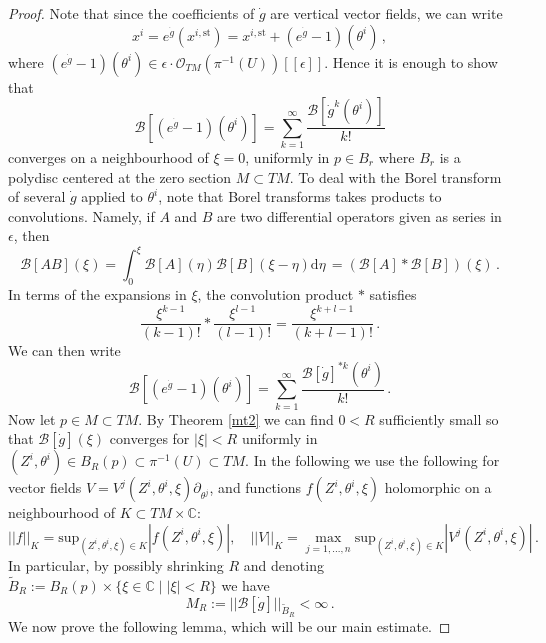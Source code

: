 \documentclass{article}
\theoremstyle{definition}
\numberwithin{equation}{section}
\begin{document}
\begin{proof}
    Note that since the coefficients of $\dot{g}$ are vertical vector fields, we can write
    \begin{equation*}
        x^i = e^{\dot{g}}(x^{i,\text{st}})=x^{i,\text{st}}+(e^{\dot{g}}-1)(\theta^i)\,,
    \end{equation*}
    where $(e^{\dot{g}}-1)(\theta^i)\in \epsilon \cdot  \mathcal{O}_{TM}(\pi^{-1}(U))[[\epsilon]]$.
    Hence it is enough to show that \begin{equation*}
        \mathcal{B}[(e^{\dot{g}}-1)(\theta^i)] = \sum_{k=1}^{\infty}\frac{\mathcal{B}[\dot{g}^k(\theta^i)]}{k!}
    \end{equation*}
    converges on a neighbourhood of $\xi=0$, uniformly in $p\in B_r$ where $B_r$ is a polydisc centered at the zero section $M\subset TM$. To deal with the Borel transform of several $\dot{g}$ applied to $\theta^i$, note that Borel transforms takes products to convolutions. Namely, if $A$ and $B$ are two differential operators given as series in $\epsilon$, then 
    \begin{equation}\label{convform}
        \mathcal{B}[AB](\xi)=\int_{0}^{\xi}\mathcal{B}[A](\eta)\mathcal{B}[B](\xi-\eta)\mathrm{d}\eta\,= (\mathcal{B}[A]*\mathcal{B}[B])(\xi)\,.
    \end{equation}
    In terms of the expansions in $\xi$, the convolution product $*$ satisfies 
    \begin{equation*}
        \frac{\xi^{k-1}}{(k-1)!}* \frac{\xi^{l-1}}{(l-1)!}=\frac{\xi^{k+l-1}}{(k+l-1)!}\,.
    \end{equation*}
    We can then write
    \begin{equation*}
        \mathcal{B}[(e^{\dot{g}}-1)(\theta^i)]=\sum_{k=1}^{\infty}\frac{\mathcal{B}[\dot{g}]^{*k}(\theta^i)}{k!}\,.
    \end{equation*}
    Now let $p\in M\subset TM$. By Theorem \ref{mt2} we can find $0<R$ sufficiently small so that $\mathcal{B}[\dot{g}](\xi)$ converges for $|\xi|<R$ uniformly in $(Z^i,\theta^i)\in B_R(p)\subset \pi^{-1}(U)\subset TM$. 
    In the following we use the following for vector fields $V=V^j(Z^i,\theta^i,\xi)\partial_{\theta^j}$, and functions $f(Z^i,\theta^i,\xi)$ holomorphic on a neighbourhood of $K\subset TM\times \mathbb{C}$:
    \begin{equation*}
        ||f||_{K}=\text{sup}_{(Z^i,\theta^i,\xi)\in K}|f(Z^i,\theta^i,\xi)|, \quad ||V||_K=\max_{j=1,...,n}\text{sup}_{(Z^i,\theta^i,\xi)\in K}|V^j(Z^i,\theta^i,\xi)|\,.
    \end{equation*}
    In particular, by possibly shrinking $R$ and denoting $\widetilde{B}_R:=B_R(p)\times \{\xi \in \mathbb{C} \; | \; |\xi|<R\}$ we have
    \begin{equation*}
        M_R := ||\mathcal{B}[\dot{g}]||_{\widetilde{B}_R}<\infty\,.
    \end{equation*}
    We now prove the following lemma, which will be our main estimate.


\end{proof}
\end{document}
